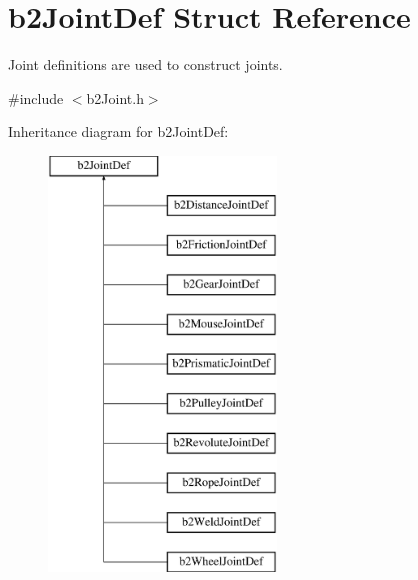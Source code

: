 \hypertarget{structb2_joint_def}{\section{b2\-Joint\-Def Struct Reference}
\label{structb2_joint_def}
}


Joint definitions are used to construct joints.  




{\ttfamily \#include $<$b2\-Joint.\-h$>$}

Inheritance diagram for b2\-Joint\-Def\-:\begin{figure}[H]
\begin{center}
\leavevmode
\includegraphics[height=11.000000cm]{structb2_joint_def}
\end{center}
\end{figure}
